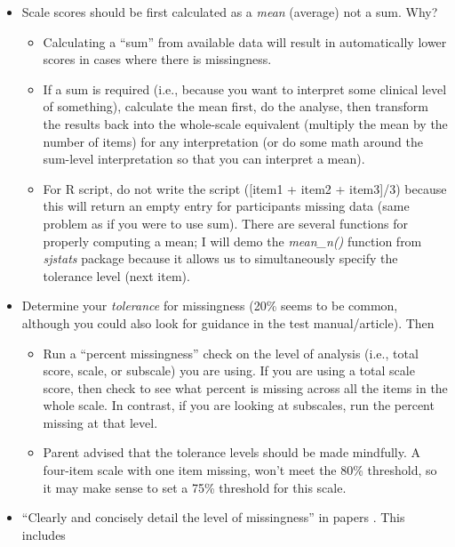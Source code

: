 \documentclass[
  english,
]{book}
\providecommand{\tightlist}{%
  \setlength{\itemsep}{0pt}\setlength{\parskip}{0pt}}
\begin{document}
\begin{itemize}
\tightlist
\item
  Scale scores should be first calculated as a \emph{mean} (average) not a sum. Why?

  \begin{itemize}
  \tightlist
  \item
    Calculating a ``sum'' from available data will result in automatically lower scores in cases where there is missingness.
  \item
    If a sum is required (i.e., because you want to interpret some clinical level of something), calculate the mean first, do the analyse, then transform the results back into the whole-scale equivalent (multiply the mean by the number of items) for any interpretation (or do some math around the sum-level interpretation so that you can interpret a mean).
  \item
    For R script, do not write the script ({[}item1 + item2 + item3{]}/3) because this will return an empty entry for participants missing data (same problem as if you were to use sum). There are several functions for properly computing a mean; I will demo the \emph{mean\_n()} function from \emph{sjstats} package because it allows us to simultaneously specify the tolerance level (next item).
  \end{itemize}
\item
  Determine your \emph{tolerance} for missingness (20\% seems to be common, although you could also look for guidance in the test manual/article). Then

  \begin{itemize}
  \tightlist
  \item
    Run a ``percent missingness'' check on the level of analysis (i.e., total score, scale, or subscale) you are using. If you are using a total scale score, then check to see what percent is missing across all the items in the whole scale. In contrast, if you are looking at subscales, run the percent missing at that level.
  \item
    Parent \citeyearpar{parent_handling_2013} advised that the tolerance levels should be made mindfully. A four-item scale with one item missing, won't meet the 80\% threshold, so it may make sense to set a 75\% threshold for this scale.
  \end{itemize}
\item
  ``Clearly and concisely detail the level of missingness'' in papers \citep[p.~595]{parent_handling_2013}. This includes


\end{itemize}
\end{document}
